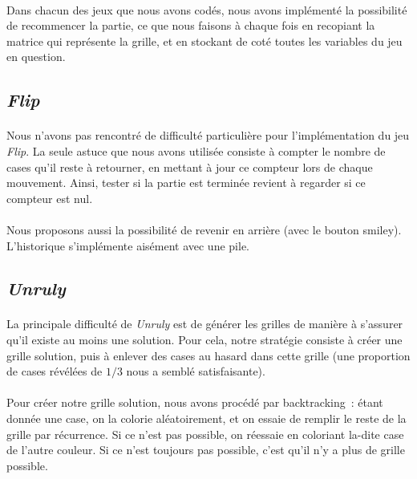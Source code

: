 \documentclass[a4paper]{article}
\begin{document}
	\paragraph{}
	Dans chacun des jeux que nous avons codés, nous avons implémenté la
	possibilité de recommencer la partie, ce que nous faisons à chaque fois en
	recopiant la matrice qui représente la grille, et en stockant de coté toutes
	les variables du jeu en question.

	\subsection{\textsl{Flip}}

	\paragraph{}
	Nous n'avons pas rencontré de difficulté particulière pour l'implémentation
	du jeu \textsl{Flip}. La seule astuce que nous avons utilisée consiste à
	compter le nombre de cases qu'il reste à retourner, en mettant à jour ce
	compteur lors de chaque mouvement. Ainsi, tester si la partie est terminée
	revient à regarder si ce compteur est nul.

	\paragraph{}
	Nous proposons aussi la possibilité de revenir en arrière (avec le bouton
	smiley). L’historique s'implémente aisément avec une pile.

	\subsection{\textsl{Unruly}}

	\paragraph{}
	La principale difficulté de \textsl{Unruly} est de générer les grilles de
	manière à s'assurer qu'il existe au moins une solution. Pour cela, notre
	stratégie consiste à créer une grille solution, puis à enlever des cases au
	hasard dans cette grille (une proportion de cases révélées de $1/3$ nous a
	semblé satisfaisante).

	\paragraph{}
	Pour créer notre grille solution, nous avons procédé par backtracking~:
	étant donnée une case, on la colorie aléatoirement, et on essaie de remplir
	le reste de la grille par récurrence. Si ce n’est pas possible, on réessaie
	en coloriant la-dite case de l'autre couleur. Si ce n’est toujours pas
	possible, c'est qu'il n'y a plus de grille possible.
\end{document}
